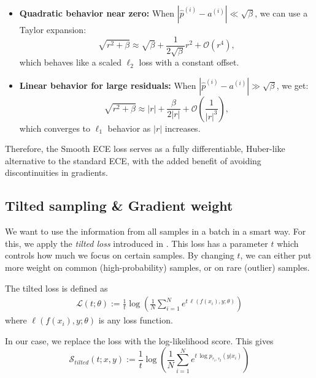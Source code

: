 \documentclass{article}
\begin{document}
\begin{itemize}
    \item \textbf{Quadratic behavior near zero:} When $|\hat{p}^{(i)} - a^{(i)}| \ll \sqrt{\beta}$, we can use a Taylor expansion:
\begin{equation}
    \sqrt{r^2 + \beta} \approx \sqrt{\beta} + \frac{1}{2\sqrt{\beta}} r^2 + \mathcal{O}(r^4),
\end{equation}
    which behaves like a scaled $\ell_2$ loss with a constant offset.
    
    \item \textbf{Linear behavior for large residuals:} When $|\hat{p}^{(i)} - a^{(i)}| \gg \sqrt{\beta}$, we get:
\begin{equation}
    \sqrt{r^2 + \beta} \approx |r| + \frac{\beta}{2 |r|} + \mathcal{O}\left(\frac{1}{|r|^3}\right),
\end{equation}
    which converges to $\ell_1$ behavior as $|r|$ increases.
\end{itemize}


Therefore, the Smooth ECE loss serves as a fully differentiable, Huber-like alternative to the standard ECE, with the added benefit of avoiding discontinuities in gradients. 


\subsection{Tilted sampling \& Gradient weight} \label{tilted}
We want to use the information from all samples in a batch in a smart way.  
For this, we apply the \emph{tilted loss} introduced in \cite{li2023tiltedlossesmachinelearning}.  
This loss has a parameter $t$ which controls how much we focus on certain samples.  
By changing $t$, we can either put more weight on common (high-probability) samples, or on rare (outlier) samples.

The tilted loss is defined as
\begin{align}
\mathcal{L}(t; \theta) := \frac{1}{t} \log \left( \frac{1}{N} \sum_{i=1}^N e^{t \,\ell(f(x_i), y; \theta)} \right)
\end{align}
where $\ell(f(x_i), y; \theta)$ is any loss function.

In our case, we replace the loss with the log-likelihood score.  
This gives
\begin{equation}
\mathcal{S}_{tilted}(t;x,y) := \frac{1}{t} \log \left( \frac{1}{N} \sum_{i=1}^N e^{t \, \log p_{\tau_1,\tau_2}(y|x_i)} \right)
\end{equation}
\end{document}
